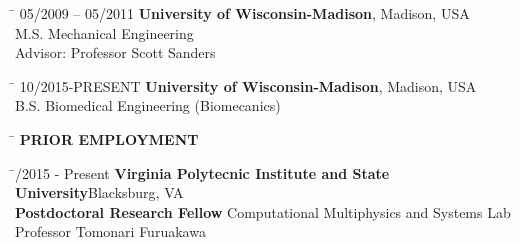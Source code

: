 \documentclass[11pt,letter]{article}
\begin{document}
\begin{tabbing}
	\hspace{3cm} \= \kill
	{\footnotesize 05/2009 -- 05/2011} \> {\bf University of Wisconsin-Madison}, Madison, USA\\
	\> M.S.  Mechanical Engineering \\
	\> Advisor: Professor Scott Sanders
\end{tabbing}
\begin{tabbing}
	\hspace{3cm} \= \kill
	{\footnotesize10/2015-PRESENT} \> {\bf University of Wisconsin-Madison}, Madison, USA\\
	\> B.S.  Biomedical Engineering (Biomecanics)\\
\end{tabbing}


\begin{tabbing}
	\hspace{1cm}\=\kill
	\>  {\bf \Large PRIOR EMPLOYMENT}
\end{tabbing}\vspace{-7mm}
\begin{tabbing}
	\hspace{3cm} \= /2015 - Present \> {\bf Virginia Polytecnic Institute and State University}\hfill{Blacksburg, VA }\\
	\> {\bfseries Postdoctoral Research Fellow}	Computational Multiphysics and Systems Lab\\
	\> Professor Tomonari Furuakawa\\
\end{tabbing}
\vspace{-1cm}
\end{document}

